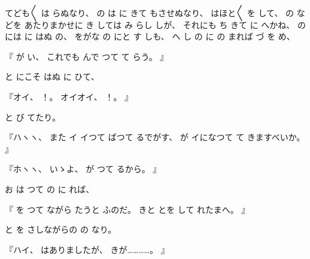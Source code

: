 
てども〳〵
は
らぬなり、
%
の
は
に
きて
もさせぬなり、
%
はほと〳〵
を
して、
%
の
などを
あたりまかせに
き
しては
み
らし
しが、
%
それにも
ち
きて
に
へかね、
%
の
には
に
はぬ
の、
%
をがな
の
にと
す
しも、
%
へ
し
の
に
の
まれば
づ
を
め、

『
が
い、
%
これでも
んで
つて
て
らう。
』

と
にこそ
はぬ
に
ひて、

『オイ、
%
！。
%
オイオイ、
%
！。
』

と
び
てたり。

『ハヽヽ、
%
また
イ
イつて
ばつて
るでがす、
%
が
イになつて
て
きますべいか。
』

『ホヽヽ、
%
いゝよ、
%
が
つて
るから。
』

お
は
つて
の
に
れば、

『
を
つて
ながら
たうと
ふのだ。
%
きと
とを
して
れたまへ。
』

と
を
さしながらの
の
なり。

『ハイ、
%
はありましたが、
%
きが…………。
』

